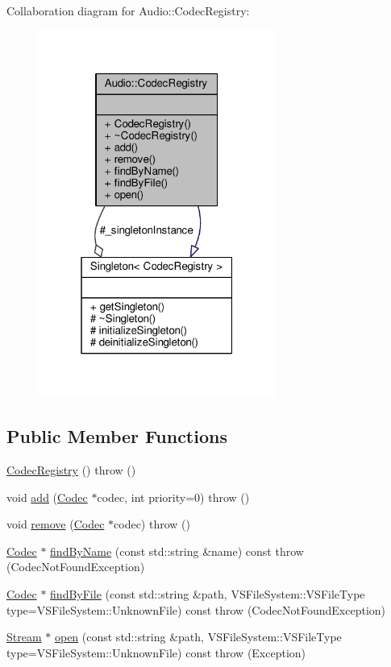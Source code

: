 Collaboration diagram for Audio\+:\+:Codec\+Registry\+:
\nopagebreak
\begin{figure}[H]
\begin{center}
\leavevmode
\includegraphics[width=220pt]{d3/dfc/classAudio_1_1CodecRegistry__coll__graph}
\end{center}
\end{figure}
\subsection*{Public Member Functions}
\begin{DoxyCompactItemize}
\item 
\hyperlink{classAudio_1_1CodecRegistry_a0b1fc60fc8571c6d0d13b17cc49091f3}{Codec\+Registry} ()  throw ()
\item 
void \hyperlink{classAudio_1_1CodecRegistry_adf1e05e89721942b570f0537607302a7}{add} (\hyperlink{classAudio_1_1Codec}{Codec} $\ast$codec, int priority=0)  throw ()
\item 
void \hyperlink{classAudio_1_1CodecRegistry_abf72b91e3cfe71074275d8dfde204765}{remove} (\hyperlink{classAudio_1_1Codec}{Codec} $\ast$codec)  throw ()
\item 
\hyperlink{classAudio_1_1Codec}{Codec} $\ast$ \hyperlink{classAudio_1_1CodecRegistry_a13ce976bea9061df6d985a7d4856249b}{find\+By\+Name} (const std\+::string \&name) const   throw (\+Codec\+Not\+Found\+Exception)
\item 
\hyperlink{classAudio_1_1Codec}{Codec} $\ast$ \hyperlink{classAudio_1_1CodecRegistry_a8deaea0aa8d872195d2aa18916b17af7}{find\+By\+File} (const std\+::string \&path, V\+S\+File\+System\+::\+V\+S\+File\+Type type=V\+S\+File\+System\+::\+Unknown\+File) const   throw (\+Codec\+Not\+Found\+Exception)
\item 
\hyperlink{classAudio_1_1Stream}{Stream} $\ast$ \hyperlink{classAudio_1_1CodecRegistry_aa5632e436185ad839fe32a588794cea8}{open} (const std\+::string \&path, V\+S\+File\+System\+::\+V\+S\+File\+Type type=V\+S\+File\+System\+::\+Unknown\+File) const   throw (\+Exception)
\end{DoxyCompactItemize}
